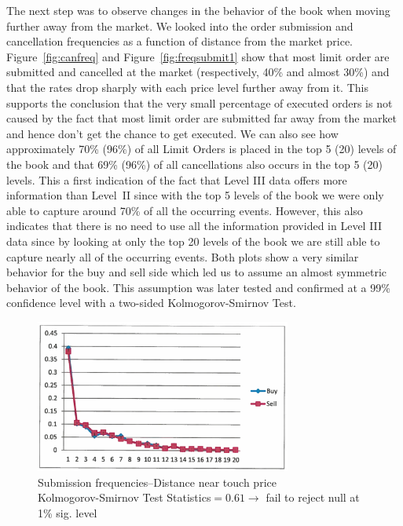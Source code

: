 The next step was to observe changes in the behavior of the book when moving further away from the market. We looked into the order submission and cancellation frequencies as a function of distance from the market price. Figure~\ref{fig:canfreq} and Figure~\ref{fig:freqsubmit1} show that most limit order are submitted and cancelled at the market (respectively, 40\% and almost 30\%) and that the rates drop sharply with each price level further away from it. This supports the conclusion that the very small percentage of executed orders is not caused by the fact that most limit order are submitted far away from the market and hence don't get the chance to get executed. We can also see how approximately 70\% (96\%) of all Limit Orders is placed in the top 5 (20) levels of the book and that 69\% (96\%) of all cancellations also occurs in the top 5 (20) levels. This a first indication of the fact that Level III data offers more information than Level~II since with the top 5 levels of the book we were only able to capture around 70\% of all the occurring events. However, this also indicates that there is no need to use all the information provided in Level III data since by looking at only the top 20 levels of the book we are still able to capture nearly all of the occurring events. Both plots show a very similar behavior for the buy and sell side which led us to assume an almost symmetric behavior of the book. This assumption was later tested and confirmed at a 99\% confidence level with a two-sided Kolmogorov-Smirnov Test. 
	\begin{figure}[!ht]
   	\centering
   	\includegraphics[width=0.75\textwidth]{chapters/chapter_trade_data_models/figures/subfreqnear.png} 
   	\caption{Submission frequencies--Distance near touch price \\ Kolmogorov-Smirnov Test Statistics$=0.61 \to$ fail to reject null at 1\% sig. level \label{fig:subfreqnear}}
	\end{figure}
